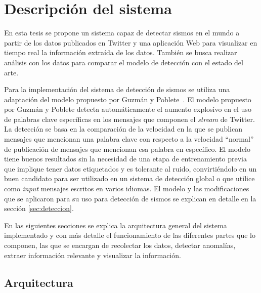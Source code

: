 % 
%

\chapter{Descripción del sistema}
\label{cap:sistema}

En esta tesis se propone un sistema capaz de detectar sismos en el mundo a partir de los datos publicados en Twitter y una aplicación Web para visualizar en tiempo real la información extraída de los datos. También se busca realizar análisis con los datos para comparar el modelo de detección con el estado del arte. 

Para la implementación del sistema de detección de sismos se utiliza una adaptación del modelo propuesto por Guzmán y Poblete~\cite{guzman2013line}. El modelo propuesto por Guzmán y Poblete detecta automáticamente el aumento explosivo en el uso de palabras clave específicas en los mensajes que componen el \textit{stream} de Twitter. La detección se basa en la comparación de la velocidad en la que se publican mensajes que mencionan una palabra clave con respecto a la velocidad ``normal'' de publicación de mensajes que mencionan esa palabra en específico. El modelo tiene buenos resultados sin la necesidad de una etapa de entrenamiento previa que implique tener datos etiquetados y es tolerante al ruido, convirtiéndolo en un buen candidato para ser utilizado en un sistema de detección global o que utilice como \textit{input} mensajes escritos en varios idiomas. El modelo y las modificaciones que se aplicaron para su uso para detección de sismos se explican en detalle en la sección \ref{sec:deteccion}.

En las siguientes secciones se explica la arquitectura general del sistema implementado y con más detalle el funcionamiento de las diferentes partes que lo componen, las que se encargan de recolectar los datos, detectar anomalías, extraer información relevante y visualizar la información. 


\section{Arquitectura}
\label{sec:arquitectura}


